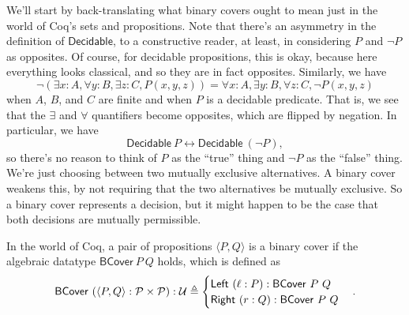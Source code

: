We'll start by back-translating what binary covers ought to mean just in the world of Coq's sets and propositions. Note that there's an asymmetry in the definition of $\mathsf{Decidable}$, to a constructive reader, at least, in considering $P$ and $\neg P$ as opposites. Of course, for decidable propositions, this is okay, because here everything looks classical, and so they are in fact opposites. Similarly, we have
\[
\neg \left( \exists x : A, \forall y : B, \exists z : C, P(x, y, z) \right) = \forall x : A, \exists y : B, \forall z : C, \neg P(x, y, z)
\]
when $A$, $B$, and $C$ are finite and when $P$ is a decidable predicate. That is, we see that the $\exists$ and $\forall$ quantifiers become opposites, which are flipped by negation. In particular, we have
\[
\mathsf{Decidable}\ P \leftrightarrow \mathsf{Decidable}\ (\neg P),
\]
so there's no reason to think of $P$ as the ``true'' thing and $\neg P$ as the ``false'' thing. We're just choosing between two mutually exclusive alternatives. A binary cover weakens this, by not requiring that the two alternatives be mutually exclusive. So a binary cover represents a decision, but it might happen to be the case that both decisions are mutually permissible.

In the world of Coq, a pair of propositions $\langle P, Q \rangle$ is a binary cover if the algebraic datatype $\mathsf{BCover}\ P\ Q$ holds, which is defined as
\[
\mathsf{BCover}\ (\langle P, Q \rangle : \Prop \times \Prop) : \Type \triangleq
  \begin{cases}
  \mathsf{Left}\ (\ell : P) : \mathsf{BCover}\ P\ Q
  \\ \mathsf{Right}\ (r : Q) : \mathsf{BCover}\ P\ Q
  \end{cases}.
\]

